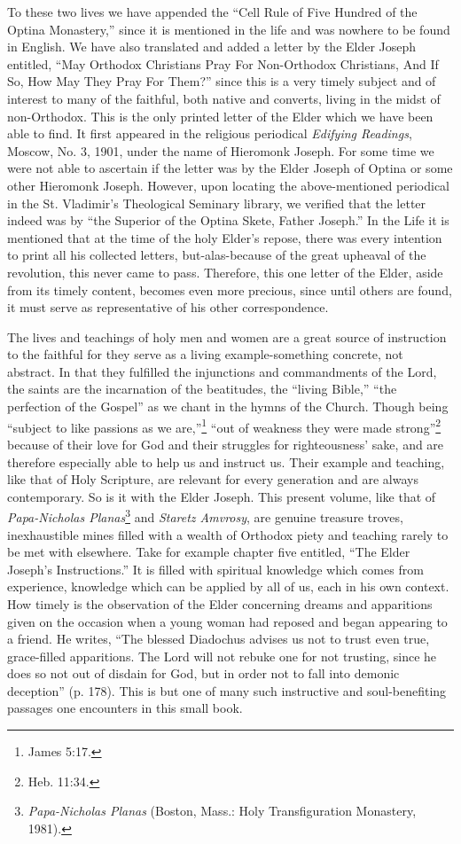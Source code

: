 To these two lives we have appended the ``Cell Rule of Five Hundred of the Optina Monastery,'' since it is mentioned in the life and was nowhere to be found in English. We have also translated and added a letter by the Elder Joseph entitled, ``May Orthodox Christians Pray For Non-Orthodox Christians, And If So, How May They Pray For Them?'' since this is a very timely subject and of interest to many of the faithful, both native and converts, living in the midst of non-Orthodox. This is the only printed letter of the Elder which we have been able to find. It first appeared in the religious periodical \textit{Edifying Readings}, Moscow, No. 3, 1901, under the name of Hieromonk Joseph. For some time we were not able to ascertain if the letter was by the Elder Joseph of Optina or some other Hieromonk Joseph. However, upon locating the above-mentioned periodical in the St. Vladimir's Theological Seminary library, we verified that the letter indeed was by ``the Superior of the Optina Skete, Father Joseph.'' In the Life it is mentioned that at the time of the holy Elder's repose, there was every intention to print all his collected letters, but-alas-because of the great upheaval of the revolution, this never came to pass. Therefore, this one letter of the Elder, aside from its timely content, becomes even more precious, since until others are found, it must serve as representative of his other correspondence.

The lives and teachings of holy men and women are a great source of instruction to the faithful for they serve as a living example-something concrete, not abstract. In that they fulfilled the injunctions and commandments of the Lord, the saints are the incarnation of the beatitudes, the ``living Bible,'' ``the perfection of the Gospel'' as we chant in the hymns of the Church. Though being ``subject to like passions as we are,''\footnote{James 5:17.} ``out of weakness they were made strong''\footnote{Heb. 11:34.} because of their love for God and their struggles for righteousness' sake, and are therefore especially able to help us and instruct us. Their example and teaching, like that of Holy Scripture, are relevant for every generation and are always contemporary. So is it with the Elder Joseph. This present volume, like that of \textit{Papa-Nicholas Planas}\footnote{\textit{Papa-Nicholas Planas} (Boston, Mass.: Holy Transfiguration Monastery, 1981).} and \textit{Staretz Amvrosy}, are genuine treasure troves, inexhaustible mines filled with a wealth of Orthodox piety and teaching rarely to be met with elsewhere. Take for example chapter five entitled, ``The Elder Joseph's Instructions.'' It is filled with spiritual knowledge which comes from experience, knowledge which can be applied by all of us, each in his own context. How timely is the observation of the Elder concerning dreams and apparitions given on the occasion when a young woman had reposed and began appearing to a friend. He writes, ``The blessed Diadochus advises us not to trust even true, grace-filled apparitions. The Lord will not rebuke one for not trusting, since he does so not out of disdain for God, but in order not to fall into demonic deception'' (p. 178). This is but one of many such instructive and soul-benefiting passages one encounters in this small book.

